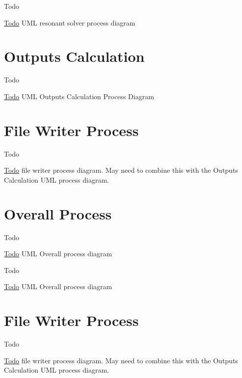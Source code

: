 \begin{DoxyRefDesc}{Todo}
\item[\hyperlink{todo__todo000020}{Todo}]U\-M\-L resonant solver process diagram\end{DoxyRefDesc}
\hypertarget{uml_outputscalculation}{}\section{Outputs Calculation}\label{uml_outputscalculation}
\begin{DoxyRefDesc}{Todo}
\item[\hyperlink{todo__todo000016}{Todo}]U\-M\-L Outputs Calculation Process Diagram\end{DoxyRefDesc}
\hypertarget{uml_writingfiles}{}\section{File Writer Process}\label{uml_writingfiles}
\begin{DoxyRefDesc}{Todo}
\item[\hyperlink{todo__todo000024}{Todo}]file writer process diagram. May need to combine this with the Outputs Calculation U\-M\-L process diagram.\end{DoxyRefDesc}
\hypertarget{UML_Overall}{}\section{Overall Process}\label{UML_Overall}
\begin{DoxyRefDesc}{Todo}
\item[\hyperlink{todo__todo000006}{Todo}]U\-M\-L Overall process diagram\end{DoxyRefDesc}


\begin{DoxyRefDesc}{Todo}
\item[\hyperlink{todo__todo000019}{Todo}]U\-M\-L Overall process diagram\end{DoxyRefDesc}
\hypertarget{UML_WritingFiles}{}\section{File Writer Process}\label{UML_WritingFiles}
\begin{DoxyRefDesc}{Todo}
\item[\hyperlink{todo__todo000009}{Todo}]file writer process diagram. May need to combine this with the Outputs Calculation U\-M\-L process diagram.\end{DoxyRefDesc}


